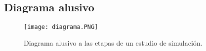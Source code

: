 \documentclass[letterpaper, 12pt]{article}
\begin{document}
\begin{justify}
        \newpage
        \section*{Diagrama alusivo}
        \begin{figure}[H]
            \centering
            \texttt{[image: diagrama.PNG]}
            \caption{Diagrama alusivo a las etapas de un estudio de simulación.}
        \end{figure}

    \end{justify}

        \thispagestyle{empty}
        \printbibliography
\end{document}
